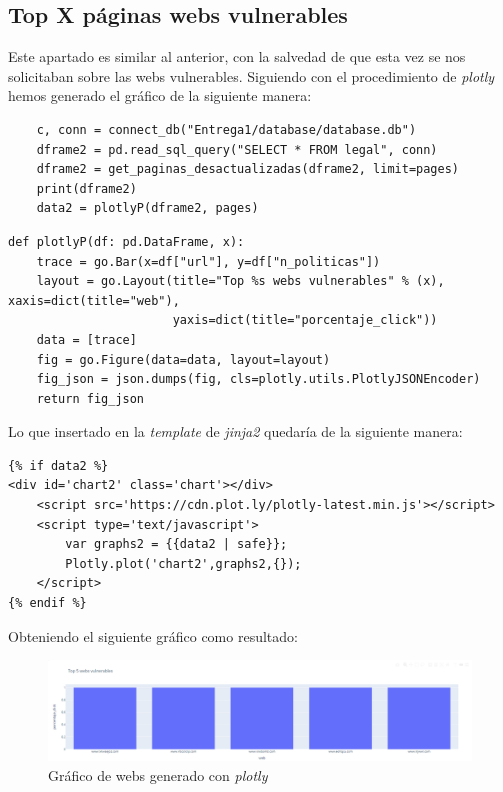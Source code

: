 \documentclass[12pt, a4paper,twoside,titlepage]{article}
\begin{document}
\subsection{Top X páginas webs vulnerables}
Este apartado es similar al anterior, con la salvedad de que esta vez se nos solicitaban sobre las webs vulnerables. Siguiendo con el procedimiento de \emph{plotly} hemos generado el gráfico de la siguiente manera:
\begin{verbatim}
    c, conn = connect_db("Entrega1/database/database.db")
    dframe2 = pd.read_sql_query("SELECT * FROM legal", conn)
    dframe2 = get_paginas_desactualizadas(dframe2, limit=pages)
    print(dframe2)
    data2 = plotlyP(dframe2, pages)
\end{verbatim}
\begin{verbatim}
def plotlyP(df: pd.DataFrame, x):
    trace = go.Bar(x=df["url"], y=df["n_politicas"])
    layout = go.Layout(title="Top %s webs vulnerables" % (x), xaxis=dict(title="web"),
                       yaxis=dict(title="porcentaje_click"))
    data = [trace]
    fig = go.Figure(data=data, layout=layout)
    fig_json = json.dumps(fig, cls=plotly.utils.PlotlyJSONEncoder)
    return fig_json
\end{verbatim}
Lo que insertado en la \emph{template} de \emph{jinja2} quedaría de la siguiente manera:
\begin{verbatim}
{% if data2 %}
<div id='chart2' class='chart'></div>
    <script src='https://cdn.plot.ly/plotly-latest.min.js'></script>
    <script type='text/javascript'>
        var graphs2 = {{data2 | safe}};
        Plotly.plot('chart2',graphs2,{});
    </script>
{% endif %}
\end{verbatim}
Obteniendo el siguiente gráfico como resultado:
\begin{figure}[H]
    \centering
    \includegraphics[width=1\linewidth]{Figuras/webs-graph.png}
    \caption{Gráfico de webs generado con \emph{plotly}}
    \label{fig:graphwebs}
\end{figure}
\end{document}
